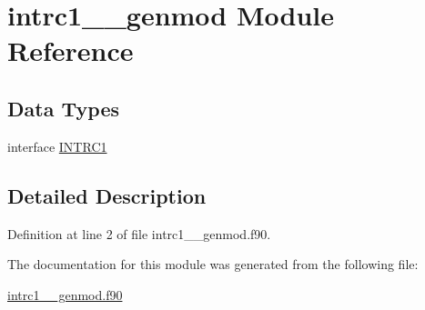 \hypertarget{classintrc1____genmod}{\section{intrc1\+\_\+\+\_\+genmod Module Reference}
\label{classintrc1____genmod}
}
\subsection*{Data Types}
\begin{DoxyCompactItemize}
\item 
interface \hyperlink{interfaceintrc1____genmod_1_1INTRC1}{I\+N\+T\+R\+C1}
\end{DoxyCompactItemize}


\subsection{Detailed Description}


Definition at line 2 of file intrc1\+\_\+\+\_\+genmod.\+f90.



The documentation for this module was generated from the following file\+:\begin{DoxyCompactItemize}
\item 
\hyperlink{intrc1____genmod_8f90}{intrc1\+\_\+\+\_\+genmod.\+f90}\end{DoxyCompactItemize}
